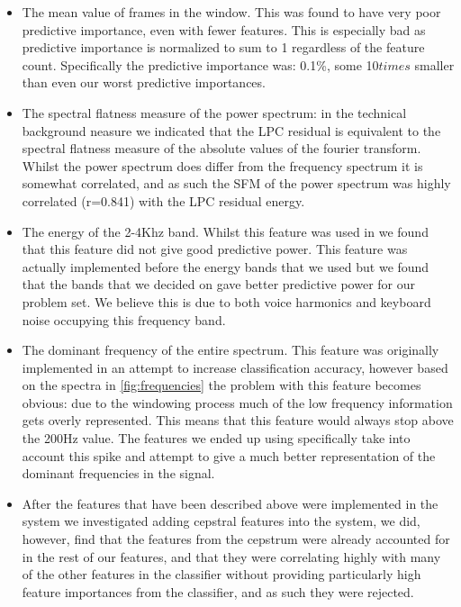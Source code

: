 \documentclass[ %
                    author={Sam Phippen},
                supervisor={Dr. Rafal Bogacz},
                     title={Real time voice activity detectors in noisy personal computing environments},
                  subtitle={},
                    degree={MEng},
                      year={2012} ]{thesis}
\begin{document}
\begin{itemize}

    \item The mean value of frames in the window. This was found to have very
        poor predictive importance, even with fewer features.  This is
        especially bad as predictive importance is normalized to sum to 1
        regardless of the feature count.  Specifically the predictive
        importance was: 0.1\%, some 10$times$ smaller than even our worst
        predictive importances.

    \item The spectral flatness measure of the power spectrum: in the technical
        background neasure we indicated that the LPC residual is equivalent to
        the spectral flatness measure of the absolute values of the fourier
        transform. Whilst the power spectrum does differ from the frequency
        spectrum it is somewhat correlated, and as such the SFM of the power
        spectrum was highly correlated (r=0.841) with the LPC residual energy.

    \item The energy of the 2-4Khz band. Whilst this feature was used in
        \cite{shin} we found that this feature did not give good predictive
        power.  This feature was actually implemented before the energy bands
        that we used but we found that the bands that we decided on gave better
        predictive power for our problem set. We believe this is due to both voice
        harmonics and keyboard noise occupying this frequency band.

    \item The dominant frequency of the entire spectrum. This feature was
        originally implemented in an attempt to increase classification
        accuracy, however based on the spectra in \ref{fig:frequencies} the
        problem with this feature becomes obvious: due to the windowing process
        much of the low frequency information gets overly represented. This
        means that this feature would always stop above the 200Hz value. The
        features we ended up using specifically take into account this spike
        and attempt to give a much better representation of the dominant
        frequencies in the signal.

    \item After the features that have been described above were implemented in
        the system we investigated adding cepstral features into the system, we
        did, however, find that the features from the cepstrum were already
        accounted for in the rest of our features, and that they were
        correlating highly with many of the other features in the classifier
        without providing particularly high feature importances from the classifier, and
        as such they were rejected.

    \end{itemize}
\end{document}
